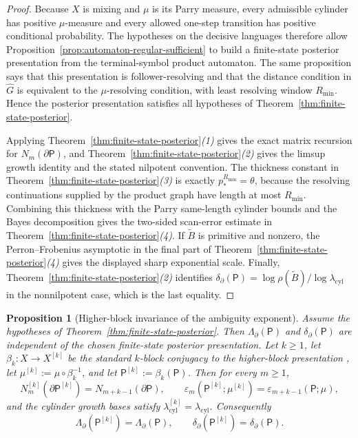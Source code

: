 \documentclass{etds}%
\numberwithin{equation}{section}
\theoremstyle{plain}
\newtheorem{proposition}[theorem]{Proposition}
\theoremstyle{definition}
\theoremstyle{remark}
\begin{document}
\begin{proof}
Because $X$ is mixing and $\mu$ is its Parry measure, every admissible cylinder
has positive $\mu$-measure and every allowed one-step transition has positive
conditional probability.  The hypotheses on the decisive languages therefore
allow Proposition~\ref{prop:automaton-regular-sufficient} to build a finite-state
posterior presentation from the terminal-symbol product automaton.  The same
proposition says that this presentation is follower-resolving and that the
distance condition in $\widehat G$ is equivalent to the
$\mu$-resolving condition, with least resolving window $R_{\min}$.  Hence the
posterior presentation satisfies all hypotheses of
Theorem~\ref{thm:finite-state-posterior}.

Applying Theorem~\ref{thm:finite-state-posterior}\emph{(1)} gives the exact
matrix recursion for $N_m(\partial\mathsf{P})$, and
Theorem~\ref{thm:finite-state-posterior}\emph{(2)} gives the limsup growth
identity and the stated nilpotent convention.  The thickness constant in
Theorem~\ref{thm:finite-state-posterior}\emph{(3)} is exactly
$p_*^{R_{\min}}=\theta$, because the resolving continuations supplied by the
product graph have length at most $R_{\min}$.  Combining this thickness with
the Parry same-length cylinder bounds and the Bayes decomposition gives the
two-sided scan-error estimate in
Theorem~\ref{thm:finite-state-posterior}\emph{(4)}.  If $\widetilde B$ is
primitive and nonzero, the Perron--Frobenius asymptotic in the final part of
Theorem~\ref{thm:finite-state-posterior}\emph{(4)} gives the displayed sharp
exponential scale.  Finally,
Theorem~\ref{thm:finite-state-posterior}\emph{(2)} identifies
$\delta_\partial(\mathsf{P})=\log\rho(\widetilde B)/
\log\lambda_{\mathrm{cyl}}$ in the nonnilpotent case, which is the last
equality.
\end{proof}

\begin{proposition}[Higher-block invariance of the ambiguity exponent]
\label{prop:higher-block-invariance}
Assume the hypotheses of Theorem~\ref{thm:finite-state-posterior}.  Then
$\Lambda_\partial(\mathsf{P})$ and
$\delta_\partial(\mathsf{P})$ are independent of the chosen finite-state
posterior presentation.  Let $k\ge 1$, let
$\beta_k:X\to X^{[k]}$ be the standard $k$-block conjugacy to the higher-block
presentation \cite{LindMarcus1995}, let
$\mu^{[k]}:=\mu\circ\beta_k^{-1}$, and let
$\mathsf{P}^{[k]}:=\beta_k(\mathsf{P})$.  Then for every $m\ge 1$,
\[
N_m^{[k]}(\partial\mathsf{P}^{[k]})
=N_{m+k-1}(\partial\mathsf{P}),
\qquad
\varepsilon_m(\mathsf{P}^{[k]};\mu^{[k]})
=\varepsilon_{m+k-1}(\mathsf{P};\mu),
\]
and the cylinder growth bases satisfy
$\lambda_{\mathrm{cyl}}^{[k]}=\lambda_{\mathrm{cyl}}$.  Consequently
\[
\Lambda_\partial(\mathsf{P}^{[k]})=\Lambda_\partial(\mathsf{P}),
\qquad
\delta_\partial(\mathsf{P}^{[k]})=\delta_\partial(\mathsf{P}).
\]
\end{proposition}
\end{document}
